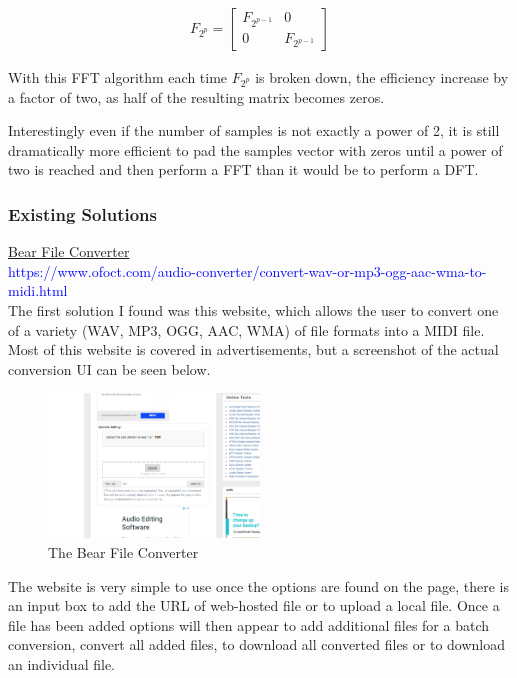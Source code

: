 \documentclass[12pt]{report}
\begin{document}
\begin{align*}
    F_{2^{p}} =
    \begin{bmatrix} 
        F_{2^{p-1}} & 0 \\
        0 & F_{2^{p-1}}
    \end{bmatrix}
\end{align*}

With this FFT algorithm each time $F_{2^{p}}$ is broken down, the efficiency increase by a factor of two, as half of the resulting matrix becomes zeros.

Interestingly even if the number of samples is not exactly a power of 2, it is still dramatically more efficient to pad the samples vector with zeros until a power of two is reached and then perform a FFT than it would be to perform a DFT.

\subsubsection*{Existing Solutions}
\underline{Bear File Converter}\\
\textcolor{blue}{https://www.ofoct.com/audio-converter/convert-wav-or-mp3-ogg-aac-wma-to-midi.html}\\
The first solution I found was this website, which allows the user to convert one of a variety (WAV, MP3, OGG, AAC, WMA) of file formats into a MIDI file. Most of this website is covered in advertisements, but a screenshot of the actual conversion UI can be seen below.

\begin{figure}[H]
	\centering
	\includegraphics[width=0.5\textwidth]{site1.PNG}
	\caption{The Bear File Converter}
	\centering
	\label{label:bear_site1}
\end{figure}

The website is very simple to use once the options are found on the page, there is an input box to add the URL of web-hosted file or to upload a local file. Once a file has been added options will then appear to add additional files for a batch conversion, convert all added files, to download all converted files or to download an individual file.
\end{document}
